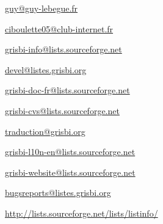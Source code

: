 \urldef{\urlGuyLebegueEmail}%
\url{guy@guy-lebegue.fr}     %

\urldef{\urlMicheleBondilEmail}%
\url{ciboulette05@club-internet.fr}     %

\urldef{\urlListInfoEmail}%
\url{grisbi-info@lists.sourceforge.net}     %

\urldef{\urlListDevelEmail}%
\url{devel@listes.grisbi.org}     %

\urldef{\urlListDocEmail}%
\url{grisbi-doc-fr@lists.sourceforge.net}     %

\urldef{\urlListCVSEmail}%
\url{grisbi-cvs@lists.sourceforge.net}     %

\urldef{\urlListTraductionEmail}%
\url{traduction@grisbi.org}  %

\urldef{\urlListAnglaiseEmail}%
\url{grisbi-l10n-en@lists.sourceforge.net}     %

\urldef{\urlListWebmestre}%
\url{grisbi-website@lists.sourceforge.net}     %

\urldef{\urlListBugsreport}%
\url{bugsreports@listes.grisbi.org}     %

\urldef{\urlListSF}%
\url{http://lists.sourceforge.net/lists/listinfo/}     %


